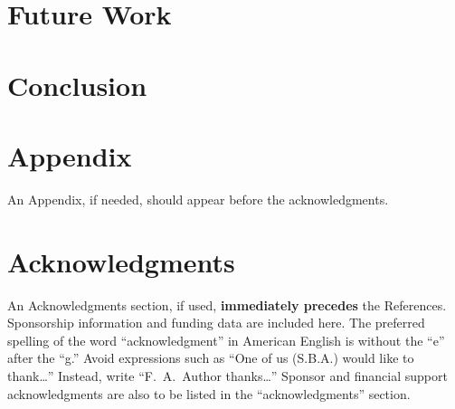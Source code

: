\documentclass[conf]{new-aiaa}
\begin{document}
\section{Future Work}




\section{Conclusion}




\section*{Appendix}

An Appendix, if needed, should appear before the acknowledgments.

\section*{Acknowledgments}
An Acknowledgments section, if used, \textbf{immediately precedes} the References. Sponsorship information and funding data are included here. The preferred spelling of the word ``acknowledgment'' in American English is without the ``e'' after the ``g.'' Avoid expressions such as ``One of us (S.B.A.) would like to thank\ldots'' Instead, write ``F.~A.~Author thanks\ldots'' Sponsor and financial support acknowledgments are also to be listed in the ``acknowledgments'' section.


\end{document}
